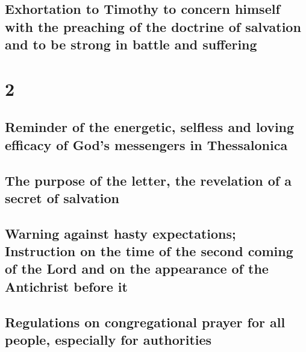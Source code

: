 \hypertarget{exhortation-to-timothy-to-concern-himself-with-the-preaching-of-the-doctrine-of-salvation-and-to-be-strong-in-battle-and-suffering}{%
\subsection{Exhortation to Timothy to concern himself with the preaching
of the doctrine of salvation and to be strong in battle and
suffering}\label{exhortation-to-timothy-to-concern-himself-with-the-preaching-of-the-doctrine-of-salvation-and-to-be-strong-in-battle-and-suffering}}

\hypertarget{section-1}{%
\section{2}\label{section-1}}

\hypertarget{reminder-of-the-energetic-selfless-and-loving-efficacy-of-gods-messengers-in-thessalonica}{%
\subsection{Reminder of the energetic, selfless and loving efficacy of
God's messengers in
Thessalonica}\label{reminder-of-the-energetic-selfless-and-loving-efficacy-of-gods-messengers-in-thessalonica}}

\hypertarget{the-purpose-of-the-letter-the-revelation-of-a-secret-of-salvation}{%
\subsection{The purpose of the letter, the revelation of a secret of
salvation}\label{the-purpose-of-the-letter-the-revelation-of-a-secret-of-salvation}}

\hypertarget{warning-against-hasty-expectations-instruction-on-the-time-of-the-second-coming-of-the-lord-and-on-the-appearance-of-the-antichrist-before-it}{%
\subsection{Warning against hasty expectations; Instruction on the time
of the second coming of the Lord and on the appearance of the Antichrist
before
it}\label{warning-against-hasty-expectations-instruction-on-the-time-of-the-second-coming-of-the-lord-and-on-the-appearance-of-the-antichrist-before-it}}

\hypertarget{regulations-on-congregational-prayer-for-all-people-especially-for-authorities}{%
\subsection{Regulations on congregational prayer for all people,
especially for
authorities}\label{regulations-on-congregational-prayer-for-all-people-especially-for-authorities}}

